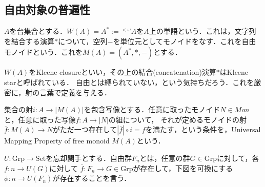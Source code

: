 \documentclass[uplatex, dvipdfmx]{jsreport}
\begin{document}
\subsection{自由対象の普遍性}

\begin{definition}[自由モノイド]\label{def-free_monoid}
    $A$を台集合とする．$W(A)=A^*:={}^{<\omega}\!A$を$A$上の単語という．これは，文字列を結合する演算$*$について，空列$-$を単位元としてモノイドをなす．これを自由モノイドという．これを$M(A)=(A^*,*,-)$とする．
\end{definition}
$W(A)$をKleene closureといい，その上の結合(concatenation)演算$*$はKleene starと呼ばれている．
自由とは縛られていない，という気持ちだろう．これを厳密に，射の言葉で定義を与える．

\begin{definition}\rm{}
    集合の射$i:A\to |M(A)|$を包含写像とする．任意に取ったモノイド$N\in Mon$と，任意に取った写像$f:A\to |N|$の組について，
    それが定めるモノイドの射$\overline{f}:M(A)\to N$がただ一つ存在して$|\overline{f}|\circ i=f$を満たす，という条件を，Universal Mapping Property of free monoid $M(A)$という．
    \begin{center}\end{center}
\end{definition}

\begin{definition}[自由群の普遍性]
    $U:\mathrm{Grp}\to\mathrm{Set}$を忘却関手とする．自由群$F_n$とは，任意の群$G\in\mathrm{Grp}$に対して，各$f:n\to U(G)$に対して
    $\overline{f}:F_n\to G\in\mathrm{Grp}$が存在して，下図を可換にする$\phi:n\to U(F_n)$が存在することを言う．
    \begin{center}\end{center}
\end{definition}
\end{document}
